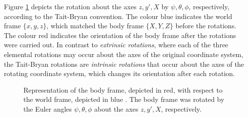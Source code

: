 \noindent
Figure \ref{fig:Euler_angles} depicts the rotation about the axes $z, y', X$ by $\psi, \theta, \phi$, respectively, according to the Tait-Bryan convention. The colour blue indicates the world frame $\{x, y, z\}$, which matched the body frame $\{X, Y, Z\}$ before the rotations. The colour red indicates the orientation of the body frame after the rotations were carried out. In contrast to \emph{extrinsic rotations}, where each of the three elemental rotations may occur about the axes of the original coordinate system, the Tait-Bryan rotations are \emph{intrinsic rotations} that occur about the axes of the rotating coordinate system, which changes its orientation after each rotation.

\begin{figure}[t]
\centering
{}
\caption[Representation of the rotated body frame with respect to the world frame.]{Representation of the body frame, depicted in red, with respect to the world frame, depicted in blue \cite{Wiki_taitbryan}. The body frame was rotated by the Euler angles $\psi, \theta, \phi$ about the axes $z, y', X$, respectively.} \label{fig:Euler_angles}
\end{figure}

